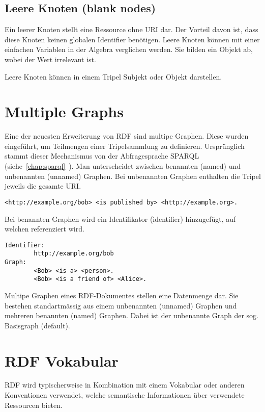 \subsection{Leere Knoten (blank nodes)}
\label{sec:rdf_rdf_dataModel_blankNodes}
Ein leerer Knoten stellt eine Ressource ohne URI dar. Der Vorteil davon ist, dass diese Knoten keinen globalen Identifier benötigen. Leere Knoten können mit einer einfachen Variablen in der Algebra verglichen werden. Sie bilden ein Objekt ab, wobei der Wert irrelevant ist.

Leere Knoten können in einem Tripel Subjekt oder Objekt darstellen.

\section{Multiple Graphs}
\label{sec:owlRdf_rdf_dataModel_multipleGraphs}
Eine der neuesten Erweiterung von RDF sind multipe Graphen. Diese wurden eingeführt, um Teilmengen einer Tripelsammlung zu definieren. Ursprünglich stammt dieser Mechanismus von der Abfragesprache SPARQL (siehe~\ref{chap:sparql}~). Man unterscheidet zwischen benannten (named) und unbenannten (unnamed) Graphen. Bei unbenannten Graphen enthalten die Tripel jeweils die gesamte URI.\@

\begin{lstlisting}[caption={Beispiel eines unbenannten (unnamed) Graphen}]
	<http://example.org/bob> <is published by> <http://example.org>.
\end{lstlisting}

Bei benannten Graphen wird ein Identifikator (identifier) hinzugefügt, auf welchen referenziert wird.

\begin{lstlisting}[caption={Beispiel eines benannten (named) Graphen}]
Identifier: 
		http://example.org/bob
Graph:
		<Bob> <is a> <person>.
		<Bob> <is a friend of> <Alice>.
\end{lstlisting}

Multipe Graphen eines RDF-Dokumentes stellen eine Datenmenge dar. Sie bestehen standartmässig aus einem unbenannten (unnamed) Graphen und mehreren benannten (named) Graphen. Dabei ist der unbenannte Graph der sog. Basisgraph (default).

\section{RDF Vokabular}
\label{sec:rdf_rdf_voca}
RDF wird typischerweise in Kombination mit einem Vokabular oder anderen Konventionen verwendet, welche semantische Informationen über verwendete Ressourcen bieten.

